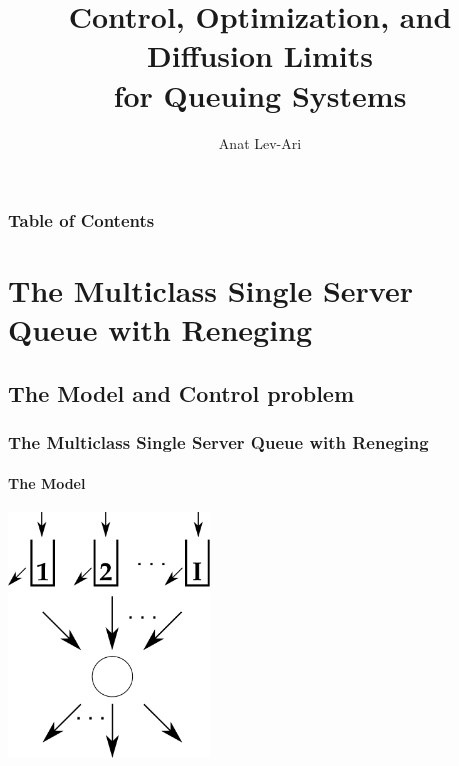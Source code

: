 \documentclass{beamer}
\title{\LARGE Control, Optimization, and Diffusion Limits \\ for Queuing Systems }
\author{\Large Anat Lev-Ari}
\institute{{\color{gray} PhD Thesis Seminar, July 17} \\ \vspace{0.5cm} {\Large Advisor: Prof. Rami Atar}}
\date{}
\begin{document}
\begin{frame}
  \nobibliography*
  \titlepage
\end{frame}



\begin{frame}
  \frametitle{Table of Contents}
  \tableofcontents
\end{frame}

%
%
% 

% 

\section{The Multiclass Single Server Queue with Reneging}
\subsection{The Model and Control problem}

\begin{frame}
  \frametitle{The Multiclass Single Server Queue with Reneging}
  \framesubtitle{The Model}
  \begin{center}
    \includegraphics[width=0.4\textwidth]{pictures/p5.pdf}
  \end{center}
\end{frame}
\end{document}

